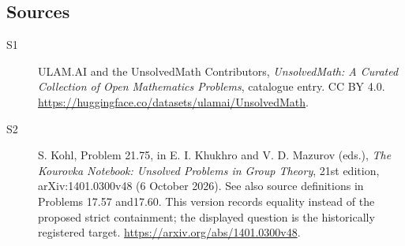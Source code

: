 \documentclass[11pt]{article}
\begin{document}
\subsection{Sources}
\begin{description}
\item[\hypertarget{source:statement:1}{S1}] ULAM.AI and the UnsolvedMath Contributors, \emph{UnsolvedMath: A Curated Collection of Open Mathematics Problems}, catalogue entry. CC BY 4.0. \url{https://huggingface.co/datasets/ulamai/UnsolvedMath}.
\item[\hypertarget{source:statement:2}{S2}] S. Kohl, Problem 21.75, in E. I. Khukhro and V. D. Mazurov (eds.), \emph{The Kourovka Notebook: Unsolved Problems in Group Theory}, 21st edition, arXiv:1401.0300v48 (6 October 2026). See also source definitions in Problems 17.57 and17.60. This version records equality instead of the proposed strict containment; the displayed question is the historically registered target. \url{https://arxiv.org/abs/1401.0300v48}.
\end{description}
\label{end:statement}
\end{document}
